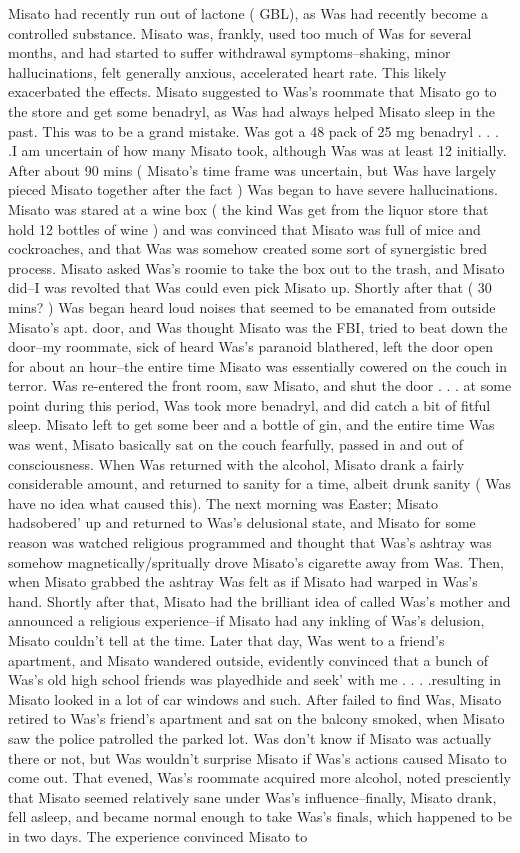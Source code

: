 \documentclass[12pt]{book}
\begin{document}
Misato had recently run out of lactone ( GBL), as Was had recently become a controlled substance. Misato was, frankly, used too much of Was for several months, and had started to suffer withdrawal symptoms--shaking, minor hallucinations, felt generally anxious, accelerated heart rate. This likely exacerbated the effects. Misato suggested to Was's roommate that Misato go to the store and get some benadryl, as Was had always helped Misato sleep in the past. This was to be a grand mistake. Was got a 48 pack of 25 mg benadryl . . .  .I am uncertain of how many Misato took, although Was was at least 12 initially. After about 90 mins ( Misato's time frame was uncertain, but Was have largely pieced Misato together after the fact ) Was began to have severe hallucinations. Misato was stared at a wine box ( the kind Was get from the liquor store that hold 12 bottles of wine ) and was convinced that Misato was full of mice and cockroaches, and that Was was somehow created some sort of synergistic bred process. Misato asked Was's roomie to take the box out to the trash, and Misato did--I was revolted that Was could even pick Misato up. Shortly after that ( 30 mins? ) Was began heard loud noises that seemed to be emanated from outside Misato's apt. door, and Was thought Misato was the FBI, tried to beat down the door--my roommate, sick of heard Was's paranoid blathered, left the door open for about an hour--the entire time Misato was essentially cowered on the couch in terror. Was re-entered the front room, saw Misato, and shut the door . . .  at some point during this period, Was took more benadryl, and did catch a bit of fitful sleep. Misato left to get some beer and a bottle of gin, and the entire time Was was went, Misato basically sat on the couch fearfully, passed in and out of consciousness. When Was returned with the alcohol, Misato drank a fairly considerable amount, and returned to sanity for a time, albeit drunk sanity ( Was have no idea what caused this). The next morning was Easter; Misato hadsobered' up and returned to Was's delusional state, and Misato for some reason was watched religious programmed and thought that Was's ashtray was somehow magnetically/spritually drove Misato's cigarette away from Was. Then, when Misato grabbed the ashtray Was felt as if Misato had warped in Was's hand. Shortly after that, Misato had the brilliant idea of called Was's mother and announced a religious experience--if Misato had any inkling of Was's delusion, Misato couldn't tell at the time. Later that day, Was went to a friend's apartment, and Misato wandered outside, evidently convinced that a bunch of Was's old high school friends was playedhide and seek' with me . . .  .resulting in Misato looked in a lot of car windows and such. After failed to find Was, Misato retired to Was's friend's apartment and sat on the balcony smoked, when Misato saw the police patrolled the parked lot. Was don't know if Misato was actually there or not, but Was wouldn't surprise Misato if Was's actions caused Misato to come out. That evened, Was's roommate acquired more alcohol, noted presciently that Misato seemed relatively sane under Was's influence--finally, Misato drank, fell asleep, and became normal enough to take Was's finals, which happened to be in two days. The experience convinced Misato to 
\end{document}
